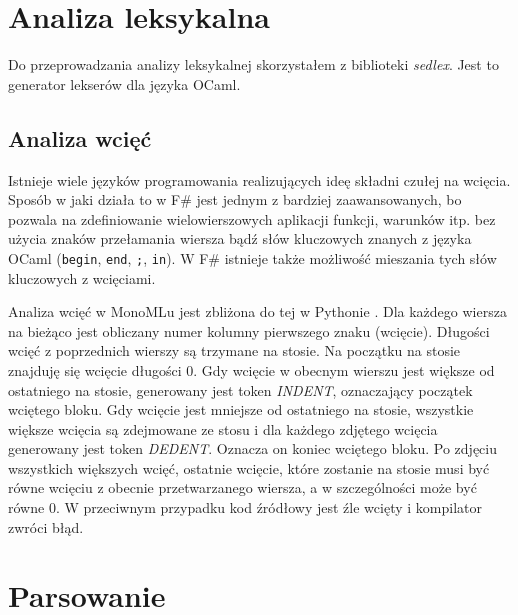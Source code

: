 \documentclass[declaration,shortabstract]{iithesis}
\begin{document}


\section{Analiza leksykalna}

Do przeprowadzania analizy leksykalnej skorzystałem z biblioteki 
\textit{sedlex}. Jest to generator lekserów dla języka OCaml.

\subsection{Analiza wcięć} \label{wciecia_omowienie}
 
Istnieje wiele języków programowania realizujących ideę składni czułej na 
wcięcia. Sposób w jaki działa to w F\# jest jednym z bardziej zaawansowanych,
bo pozwala na zdefiniowanie wielowierszowych aplikacji funkcji, warunków itp. 
bez użycia znaków przełamania wiersza bądź słów kluczowych znanych 
z języka OCaml (\texttt{begin}, \texttt{end}, \texttt{;}, \texttt{in}).
 W F\# 
istnieje 
także możliwość mieszania tych słów kluczowych z wcięciami. 

Analiza wcięć w MonoMLu jest zbliżona do tej w Pythonie
\cite{python_indentation}. Dla każdego wiersza
na bieżąco jest obliczany numer kolumny pierwszego znaku (wcięcie). Długości 
wcięć z poprzednich wierszy są trzymane na stosie. Na początku na stosie
znajduję się wcięcie długości $0$. Gdy wcięcie w obecnym wierszu jest większe od 
ostatniego na stosie, generowany jest token \textit{INDENT}, oznaczający 
początek wciętego bloku. Gdy wcięcie jest mniejsze od ostatniego na stosie, 
wszystkie większe wcięcia są zdejmowane ze stosu i dla każdego zdjętego wcięcia 
generowany jest token \textit{DEDENT}. Oznacza on koniec wciętego bloku. 
Po zdjęciu 
wszystkich większych wcięć, ostatnie wcięcie, które zostanie na stosie musi być 
równe wcięciu z obecnie przetwarzanego wiersza, a w szczególności może być równe $0$. 
W przeciwnym 
przypadku kod źródłowy jest źle wcięty i kompilator zwróci błąd.

\section{Parsowanie}
\end{document}

